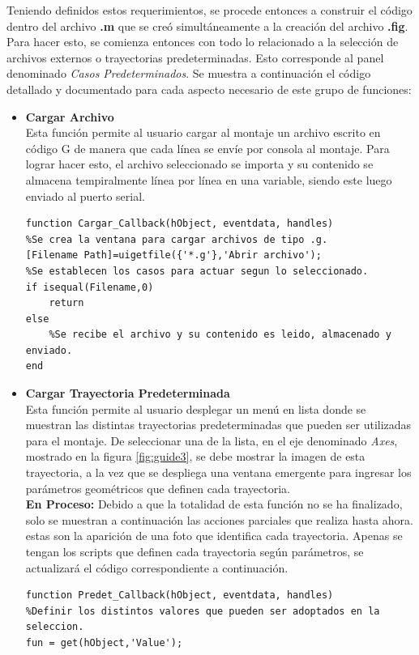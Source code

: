 \documentclass{article}
\begin{document}
\begin{multicols}{2}
Teniendo definidos estos requerimientos, se procede entonces a construir el código dentro del archivo \textbf{.m} que se creó simultáneamente a la creación del archivo \textbf{.fig}. Para hacer esto, se comienza entonces con todo lo relacionado a la selección de archivos externos o trayectorias predeterminadas. Esto corresponde al panel denominado \textit{Casos Predeterminados}. Se muestra a continuación el código detallado y documentado para cada aspecto necesario de este grupo de funciones:
\begin{itemize}
\item \textbf{Cargar Archivo}\\
Esta función permite al usuario cargar al montaje un archivo escrito en código G de manera que cada línea se envíe por consola al montaje. Para lograr hacer esto, el archivo seleccionado se importa y su contenido se almacena tempiralmente línea por línea en una variable, siendo este luego enviado al puerto serial.
\begin{lstlisting}
function Cargar_Callback(hObject, eventdata, handles)
%Se crea la ventana para cargar archivos de tipo .g. 
[Filename Path]=uigetfile({'*.g'},'Abrir archivo');
%Se establecen los casos para actuar segun lo seleccionado.
if isequal(Filename,0)
    return
else
    %Se recibe el archivo y su contenido es leido, almacenado y enviado.
end
\end{lstlisting}
\item \textbf{Cargar Trayectoria Predeterminada}\\
Esta función permite al usuario desplegar un menú en lista donde se muestran las distintas trayectorias predeterminadas que pueden ser utilizadas para el montaje. De seleccionar una de la lista, en el eje denominado \textit{Axes}, mostrado en la figura \ref{fig:guide3}, se debe mostrar la imagen de esta trayectoria, a la vez que se despliega una ventana emergente para ingresar los parámetros geométricos que definen cada trayectoria.\\
\textbf{En Proceso:} Debido a que la totalidad de esta función no se ha finalizado, solo se muestran a continuación las acciones parciales que realiza hasta ahora. estas son la aparición de una foto que identifica cada trayectoria. Apenas se tengan los scripts que definen cada trayectoria según parámetros, se actualizará el código correspondiente a continuación.
\begin{lstlisting}
function Predet_Callback(hObject, eventdata, handles)
%Definir los distintos valores que pueden ser adoptados en la seleccion.
fun = get(hObject,'Value');

\end{lstlisting}
\end{itemize}
\end{multicols}
\end{document}
